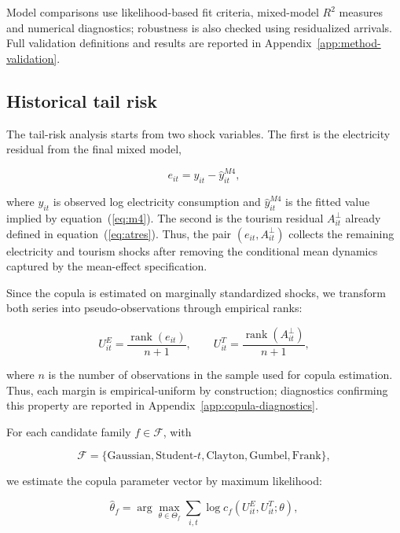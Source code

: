 \documentclass[11pt,a4paper]{article}
\begin{document}
Model comparisons use likelihood-based fit criteria, mixed-model $R^2$ measures and numerical diagnostics; robustness is also checked using residualized arrivals. Full validation definitions and results are reported in Appendix~\ref{app:method-validation}.

\subsection{Historical tail risk}

The tail-risk analysis starts from two shock variables. The first is the electricity residual from the final mixed model,

\begin{equation}
\label{eq:eresid}
e_{it} = y_{it} - \widehat{y}_{it}^{M4},
\end{equation}

where $y_{it}$ is observed log electricity consumption and $\widehat{y}_{it}^{M4}$ is the fitted value implied by equation~(\ref{eq:m4}). The second is the tourism residual $A^{\perp}_{it}$ already defined in equation~(\ref{eq:atres}). Thus, the pair $(e_{it}, A^{\perp}_{it})$ collects the remaining electricity and tourism shocks after removing the conditional mean dynamics captured by the mean-effect specification.

Since the copula is estimated on marginally standardized shocks, we transform both series into pseudo-observations through empirical ranks:

\begin{equation}
\label{eq:pobs}
U^E_{it} = \frac{\operatorname{rank}(e_{it})}{n+1}, \qquad U^T_{it} = \frac{\operatorname{rank}(A^{\perp}_{it})}{n+1},
\end{equation}

where $n$ is the number of observations in the sample used for copula estimation. Thus, each margin is empirical-uniform by construction; diagnostics confirming this property are reported in Appendix~\ref{app:copula-diagnostics}.

For each candidate family $f \in \mathcal{F}$, with

$$
\mathcal{F} = \{\text{Gaussian}, \text{Student-}t, \text{Clayton}, \text{Gumbel}, \text{Frank}\},
$$

we estimate the copula parameter vector by maximum likelihood:

\begin{equation}
\label{eq:copula-ml}
\widehat{\theta}_f = \arg\max_{\theta \in \Theta_f} \sum_{i,t} \log c_f\left(U^E_{it}, U^T_{it}; \theta\right),
\end{equation}
\end{document}
